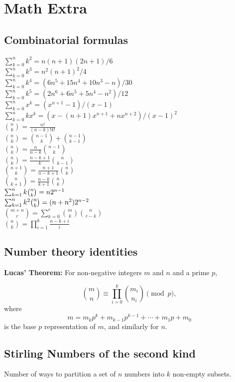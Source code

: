 \documentclass[portrait, 8pt, a4paper, oneside, twocolumn]{extarticle}
\begin{document}
\section{Math Extra}
\subsection{Combinatorial formulas}

$\sum_{k=0}^{n}k^{2}=n(n+1)(2n+1)/6$\\
$\sum_{k=0}^{n}k^{3}=n^{2}(n+1)^{2}/4$\\
$\sum_{k=0}^{n}k^{4}=(6n^{5}+15n^{4}+10n^{3}-n)/30$\\
$\sum_{k=0}^{n}k^{5}=(2n^{6}+6n^{5}+5n^{4}-n^{2})/12$\\
$\sum_{k=0}^{n}x^{k}=(x^{n+1}-1)/(x-1)$\\
$\sum_{k=0}^{n}kx^{k}=(x-(n+1)x^{n+1}+nx^{n+2})/(x-1)^{2}$\\
${n \choose k}=\frac{n!}{(n-k)!k!}$\\
${n \choose k}={n-1 \choose k}+{n-1 \choose k-1}$\\
${n \choose k}=\frac{n}{n-k}{n-1 \choose k}$\\
${n \choose k}=\frac{n-k+1}{k}{n \choose k-1}$\\
${n+1 \choose k}=\frac{n+1}{n-k+1}{n \choose k}$\\
${n \choose k+1}=\frac{n-k}{k+1}{n \choose k}$\\
$\sum_{k=1}^{n}k\tbinom{n}{k}=n2^{n-1}$\\
$\sum_{k=1}^{n}k^{2}\tbinom{n}{k}=(n+n^{2})2^{n-2}$\\
${m+n \choose r}=\sum_{k=0}^{r}{m \choose k}{n \choose r-k}$\\
${n \choose k}=\prod_{i=1}^{k}\frac{n-k+i}{i}$\\

\subsection{Number theory identities}
\textbf{Lucas' Theorem:} For non-negative integers $m$ and $n$ and a prime $p$,

$$\binom{m}{n}\equiv\prod_{i=0}^k\binom{m_i}{n_i}\pmod p,$$
where
$$m=m_kp^k+m_{k-1}p^{k-1}+\cdots +m_1p+m_0$$
is the base $p$ representation of $m$, and similarly for $n$.

\subsection{Stirling Numbers of the second kind}
Number of ways to partition a set of $n$ numbers into $k$ non-empty subsets.
\end{document}
